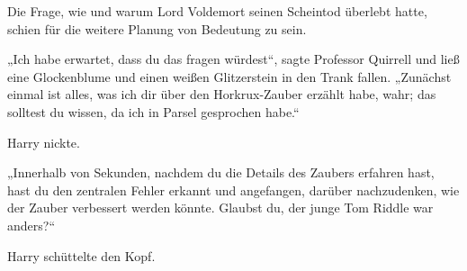 Die Frage, wie und warum Lord Voldemort seinen Scheintod überlebt hatte, schien für die weitere Planung von Bedeutung zu sein.

„Ich habe erwartet, dass du das fragen würdest“, sagte Professor Quirrell und ließ eine Glockenblume und einen weißen Glitzerstein in den Trank fallen.
„Zunächst einmal ist alles, was ich dir über den Horkrux-Zauber erzählt habe, wahr; das solltest du wissen, da ich in Parsel gesprochen habe.“

Harry nickte.

„Innerhalb von Sekunden, nachdem du die Details des Zaubers erfahren hast, hast du den zentralen Fehler erkannt und angefangen, darüber nachzudenken, wie der Zauber verbessert werden könnte. Glaubst du, der junge Tom Riddle war anders?“

Harry schüttelte den Kopf.


